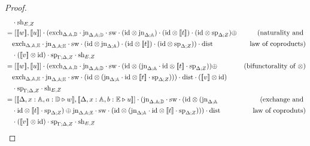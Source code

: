 \documentclass[10pt,a4paper]{amsart}
\theoremstyle{definition}
\theoremstyle{definition}
\theoremstyle{definition}
\theoremstyle{definition}
\theoremstyle{definition}
\theoremstyle{definition}
\begin{document}
\begin{proof}
\begin{align*}
  & \hspace{10pt} \comp \text{sh}_{E,Z} \\
  & =  \left[[\![w ]\!] ,[\![ u]\!] \right] \comp (\text{exch}_{\Delta, \typeA,\typeD} \comp \text{jn}_{\Delta, \typeA; \typeD} \comp \sw \comp (\text{id} \otimes  \text{jn}_{\Delta; \typeA} ) \comp (\text{id} \otimes [\![t]\!]) \comp  (\text{id} \otimes \text{sp}_{\Delta; Z} ) \oplus   & {(\text{naturality and }} \\
  & \hspace{10pt} \text{exch}_{\Delta, \typeA,\typeE} \comp \text{jn}_{\Delta, \typeA; \typeE} \comp \sw \comp (\text{id} \otimes  \text{jn}_{\Delta; \typeA} ) \comp (\text{id} \otimes [\![t]\!]) \comp  (\text{id} \otimes \text{sp}_{\Delta; Z} ) )\comp \dist & {\text{law of coproducts})} \\
  &  \hspace{10pt} \comp ([\![v]\!] \otimes \text{id})  \comp \text{sp}_{\Gamma; \Delta, Z} \comp \text{sh}_{E,Z} \\
  & =  \left[[\![w]\!] ,[\![u]\!] \right] \comp (\text{exch}_{\Delta, \typeA,\typeD} \comp \text{jn}_{\Delta, \typeA; \typeD} \comp \sw \comp (\text{id} \otimes  (\text{jn}_{\Delta; \typeA} \comp \text{id} \otimes [\![t]\!] \comp \text{sp}_{\Delta; Z}) ) \oplus   & {(\text{bifunctorality of  } \otimes)} \\
  & \hspace{10pt}  \text{exch}_{\Delta, \typeA,\typeE} \comp \text{jn}_{\Delta, \typeA; \typeE} \comp \sw \comp (\text{id} \otimes  (\text{jn}_{\Delta; \typeA} \comp \text{id} \otimes [\![t]\!] \comp \text{sp}_{\Delta; Z}) ))\comp \dist \comp ([\![v]\!] \otimes \text{id})  \\
  &  \hspace{10pt}  \comp \text{sp}_{\Gamma; \Delta, Z} \comp \text{sh}_{E,Z} \\
  & = [[\![ \Delta  , x:\typeA ,  a:\typeD \vljud w]\!] , [\![ \Delta  , x:\typeA ,  b:\typeE \vljud u]\!]]  \comp (  \text{jn}_{\Delta, \typeA; \typeD} \comp \sw \comp (\text{id} \otimes  (\text{jn}_{\Delta; \typeA}         & {(\text{exchange and }}  \\
  & \hspace{10pt} \comp \text{id} \otimes [\![t]\!]  \comp \text{sp}_{\Delta; Z})  \oplus \text{jn}_{\Delta, \typeA; \typeE} \comp \sw \comp (\text{id} \otimes  (\text{jn}_{\Delta; \typeA} \comp \text{id} \otimes [\![t]\!] \comp \text{sp}_{\Delta; Z}) )  ) \comp \dist  & { \text{law of coproduts})}\\
  & \hspace{10pt} \comp ([\![v]\!] \otimes \text{id})   \comp \text{sp}_{\Gamma; \Delta, Z} \comp \text{sh}_{E,Z} \\

\end{align*}
\end{proof}
\end{document}
